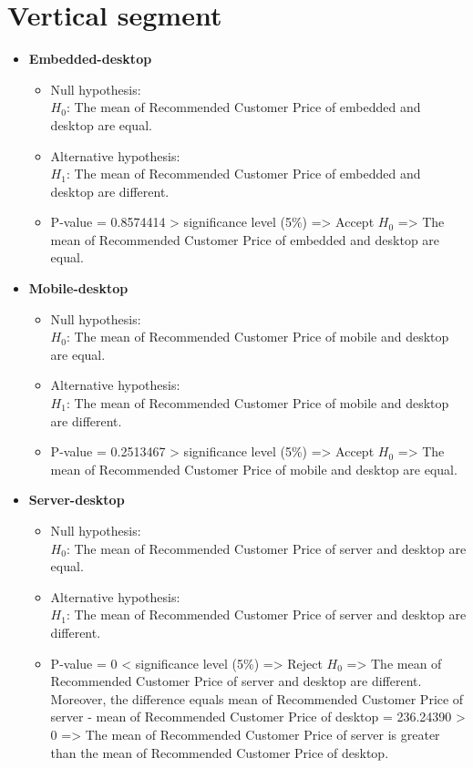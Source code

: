 \documentclass[a4paper]{article}
\begin{document}
	\section*{Vertical segment}
	\begin{itemize}
		\item \textbf{Embedded-desktop}
		\begin{itemize}
			\item Null hypothesis:\\
			\(H_0\): The mean of Recommended Customer Price of embedded and desktop are equal.
			\item Alternative hypothesis:\\
			\(H_1\): The mean of Recommended Customer Price of embedded and desktop are different.
			\item P-value = 0.8574414 > significance level (5\%) => Accept \(H_0\) => The mean of Recommended Customer Price of embedded and desktop are equal.
		\end{itemize}
		
		\item \textbf{Mobile-desktop}
		\begin{itemize}
			\item Null hypothesis:\\
			\(H_0\): The mean of Recommended Customer Price of mobile and desktop are equal.
			\item Alternative hypothesis:\\
			\(H_1\): The mean of Recommended Customer Price of mobile and desktop are different.
			\item P-value = 0.2513467 > significance level (5\%) => Accept \(H_0\) => The mean of Recommended Customer Price of mobile and desktop are equal.
		\end{itemize}
		
		\item \textbf{Server-desktop}
		\begin{itemize}
			\item Null hypothesis:\\
			\(H_0\): The mean of Recommended Customer Price of server and desktop are equal.
			\item Alternative hypothesis:\\
			\(H_1\): The mean of Recommended Customer Price of server and desktop are different.
			\item P-value = 0 < significance level (5\%) => Reject \(H_0\) => The mean of Recommended Customer Price of server and desktop are different. Moreover, the difference equals mean of Recommended Customer Price of server - mean of Recommended Customer Price of desktop = 236.24390 > 0 => The mean of Recommended Customer Price of server is greater than the mean of Recommended Customer Price of desktop.
		\end{itemize}
		

\end{itemize}
\end{document}
